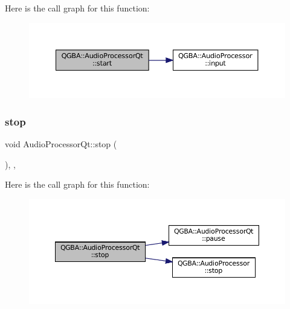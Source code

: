 Here is the call graph for this function\+:
\nopagebreak
\begin{figure}[H]
\begin{center}
\leavevmode
\includegraphics[width=350pt]{class_q_g_b_a_1_1_audio_processor_qt_ad6e05f0d076d2f7dce9f33074d0c7702_cgraph}
\end{center}
\end{figure}
\mbox{\label{class_q_g_b_a_1_1_audio_processor_qt_a5b4b772046e56db6be5047e88d6d27ae}} 
\subsubsection{\texorpdfstring{stop}{stop}}
{\footnotesize\ttfamily void Audio\+Processor\+Qt\+::stop (\begin{DoxyParamCaption}{ }\end{DoxyParamCaption})\hspace{0.3cm}{\ttfamily [override]}, {\ttfamily [virtual]}, {\ttfamily [slot]}}

Here is the call graph for this function\+:
\nopagebreak
\begin{figure}[H]
\begin{center}
\leavevmode
\includegraphics[width=350pt]{class_q_g_b_a_1_1_audio_processor_qt_a5b4b772046e56db6be5047e88d6d27ae_cgraph}
\end{center}
\end{figure}


